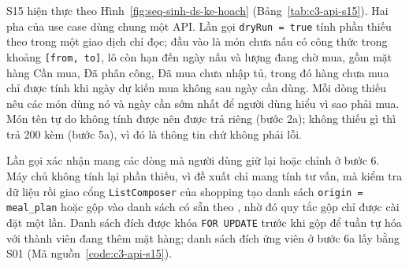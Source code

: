 S15 hiện thực  theo Hình~\ref{fig:seq-sinh-ds-ke-hoach} (Bảng~\ref{tab:c3-api-s15}). Hai pha của use case dùng chung một API. Lần gọi \texttt{dryRun = true} tính phần thiếu theo  trong một giao dịch chỉ đọc; đầu vào là món chưa nấu có công thức trong khoảng \texttt{[from, to]}, lô còn hạn đến ngày nấu và lượng đang chờ mua, gồm mặt hàng Cần mua, Đã phân công, Đã mua chưa nhập tủ, trong đó hàng chưa mua chỉ được tính khi ngày dự kiến mua không sau ngày cần dùng. Mỗi dòng thiếu nêu các món dùng nó và ngày cần sớm nhất để người dùng hiểu vì sao phải mua. Món tên tự do không tính được nên được trả riêng (bước 2a); không thiếu gì thì trả 200 kèm  (bước 5a), vì đó là thông tin chứ không phải lỗi.

Lần gọi xác nhận mang các dòng mà người dùng giữ lại hoặc chỉnh ở bước 6. Máy chủ không tính lại phần thiếu, vì đề xuất chỉ mang tính tư vấn, mà kiểm tra dữ liệu rồi giao cổng \texttt{ListComposer} của shopping tạo danh sách \texttt{origin = meal\_plan} hoặc gộp vào danh sách có sẵn theo , nhờ đó quy tắc gộp chỉ được cài đặt một lần. Danh sách đích được khóa \texttt{FOR UPDATE} trước khi gộp để tuần tự hóa với thành viên đang thêm mặt hàng; danh sách đích ứng viên ở bước 6a lấy bằng S01 (Mã nguồn~\ref{code:c3-api-s15}).

